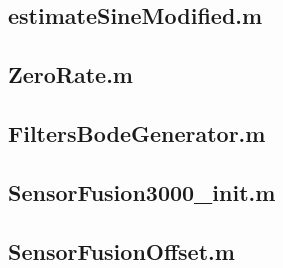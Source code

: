 \documentclass{article}
\theoremstyle{plain}
\theoremstyle{definition}
\theoremstyle{remark}
\begin{document}
\subsection{estimateSineModified.m}



\subsection{ZeroRate.m}


\subsection{FiltersBodeGenerator.m}


\subsection{SensorFusion3000\_init.m}



\subsection{SensorFusionOffset.m}

\end{document}
